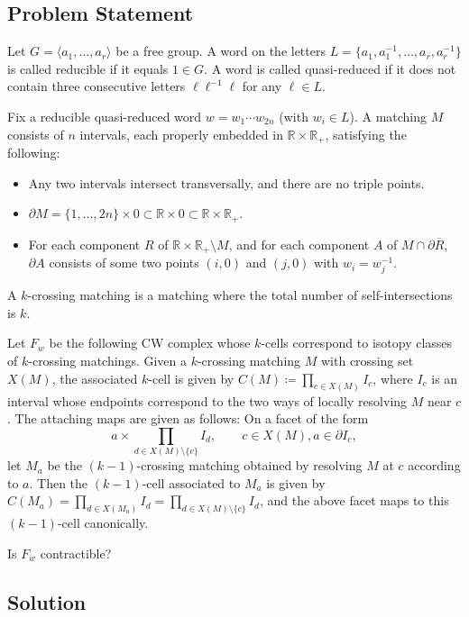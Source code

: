 \documentclass[12pt]{article}
\newcommand{\RR}{\mathbb{R}}
\newcommand{\bdy}{\partial}
\newcommand{\defeq}{\coloneqq}
\begin{document}
\date{}


\subsection*{Problem Statement}

Let $G=\langle a_1,\dots,a_r\rangle$ be a free group. A word on the
letters $L=\{a_1,a_1^{-1},\dots,a_r,a_r^{-1}\}$ is called reducible
if it equals $1\in G$. A word is called quasi-reduced if it does not
contain three consecutive letters $\ell\ell^{-1}\ell$ for any
$\ell \in L$.

Fix a reducible quasi-reduced word $w=w_1\cdots w_{2n}$ (with $w_i\in L$). A
matching $M$ consists of $n$ intervals, each properly embedded in
$\RR\times\RR_+$, satisfying the following:
\begin{itemize}
\item Any two intervals intersect
  transversally, and there are no triple points.
\item $\bdy M=\{1,\dots,2n\}\times 0\subset\RR\times 0\subset
  \RR\times\RR_+$.
\item For each component $R$ of
  $\RR\times\RR_+\setminus M$, and for each component $A$ of $M\cap \bdy\overline{R}$, $\bdy A$ consists of some two points $(i,0)$ and $(j,0)$ with $w_i=w_j^{-1}$. 
\end{itemize}
A $k$-crossing
matching is a matching where the total number of self-intersections
is $k$.

Let $F_w$ be the following CW complex whose $k$-cells correspond to
isotopy classes of $k$-crossing matchings. Given a $k$-crossing
matching $M$ with crossing set $X(M)$, the associated $k$-cell is
given by $C(M)\defeq \prod_{c\in X(M)}I_c$, where $I_c$ is an
interval whose endpoints correspond to the two ways of locally
resolving $M$ near $c$. The attaching maps are given as follows: On
a facet of the form
\[
  a\times\prod_{d\in X(M)\setminus\{c\}}I_{d},\qquad c\in X(M),a\in \bdy I_c,
\]
let $M_a$ be the $(k-1)$-crossing matching obtained by resolving $M$
at $c$ according to $a$. Then the $(k-1)$-cell associated to $M_a$
is given by
$C(M_a)=\prod_{d\in X(M_a)}I_d=\prod_{d\in X(M)\setminus\{c\}}I_{d}$, and the
above facet maps to this $(k-1)$-cell canonically.

Is $F_w$ contractible?

\subsection*{Solution}
\end{document}
